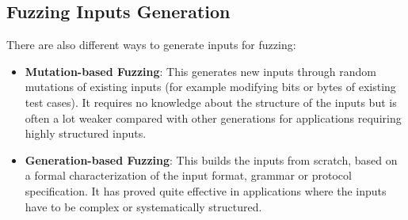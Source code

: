 \subsection{Fuzzing Inputs Generation}
There are also different ways to generate inputs for fuzzing:
\begin{itemize}
    \item \textbf{Mutation-based Fuzzing}: This generates new inputs through random mutations of existing inputs (for example modifying bits or bytes of existing test cases). It requires no knowledge about the structure of the inputs but is often a lot weaker compared with other generations for applications requiring highly structured inputs.
    
    \item \textbf{Generation-based Fuzzing}: This builds the inputs from scratch, based on a formal characterization of the input format, grammar or protocol specification. It has proved quite effective in applications where the inputs have to be complex or systematically structured.
\end{itemize}

